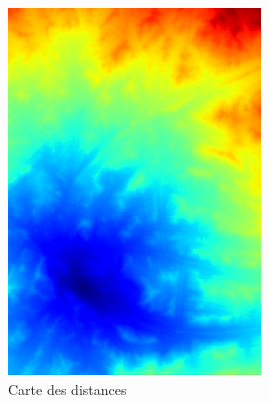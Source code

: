 \documentclass{article}
\begin{document}
\begin{figure}[h!]
\begin{minipage}{0.24\textwidth}
        \includegraphics[width=\linewidth]{result_image/Image_2/3.png}
        \caption*{\small Carte des distances}
    \end{minipage}\hfill
    \begin{minipage}{0.24\textwidth}
        \centering

\end{minipage}
\end{figure}
\end{document}
